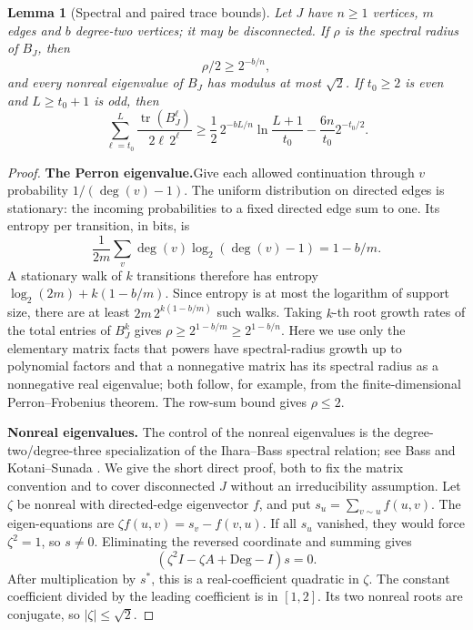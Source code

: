 \documentclass[11pt,a4paper]{article}
\numberwithin{equation}{section}
\newtheorem{lemma}[theorem]{Lemma}
\theoremstyle{definition}
\theoremstyle{remark}
\newcommand{\tr}{\operatorname{tr}}
\newcommand{\proofstep}[1]{\par\addvspace{\medskipamount}\noindent\textbf{#1}\enspace\ignorespaces}
\begin{document}
\begin{lemma}[Spectral and paired trace bounds]\label{lem:trace}
Let $J$ have $n\ge1$ vertices, $m$ edges and $b$ degree-two vertices; it may be disconnected. If $\rho$ is the spectral radius of $B_J$, then
\[
 \rho/2\ge2^{-b/n},
\]
and every nonreal eigenvalue of $B_J$ has modulus at most $\sqrt2$. If $t_0\ge2$ is even and $L\ge t_0+1$ is odd, then
\begin{equation}\label{eq:paired-trace}
 \sum_{\ell=t_0}^{L}\frac{\tr(B_J^\ell)}{2\ell\,2^\ell}
 \ge \frac12\,2^{-bL/n}\ln\frac{L+1}{t_0}
          -\frac{6n}{t_0}2^{-t_0/2}.
\end{equation}
\end{lemma}
\begin{proof}
\textbf{The Perron eigenvalue.}\enspace Give each allowed continuation through $v$ probability $1/(\deg(v)-1)$. The uniform distribution on directed edges is stationary: the incoming probabilities to a fixed directed edge sum to one. Its entropy per transition, in bits, is
\[
 \frac1{2m}\sum_v\deg(v)\log_2(\deg(v)-1)=1-b/m.
\]
A stationary walk of $k$ transitions therefore has entropy $\log_2(2m)+k(1-b/m)$. Since entropy is at most the logarithm of support size, there are at least $2m\,2^{k(1-b/m)}$ such walks. Taking $k$-th root growth rates of the total entries of $B_J^k$ gives $\rho\ge2^{1-b/m}\ge2^{1-b/n}$. Here we use only the elementary matrix facts that powers have spectral-radius growth up to polynomial factors and that a nonnegative matrix has its spectral radius as a nonnegative real eigenvalue; both follow, for example, from the finite-dimensional Perron--Frobenius theorem. The row-sum bound gives $\rho\le2$.

\proofstep{Nonreal eigenvalues.}
The control of the nonreal eigenvalues is the degree-two/degree-three specialization of the Ihara--Bass spectral relation; see Bass \cite{Bass} and Kotani--Sunada \cite[Theorem~1.3(2)]{KS}. We give the short direct proof, both to fix the matrix convention and to cover disconnected $J$ without an irreducibility assumption. Let $\zeta$ be nonreal with directed-edge eigenvector $f$, and put $s_u=\sum_{v\sim u}f(u,v)$. The eigen-equations are $\zeta f(u,v)=s_v-f(v,u)$. If all $s_u$ vanished, they would force $\zeta^2=1$, so $s\ne0$. Eliminating the reversed coordinate and summing gives
\[
 (\zeta^2 I-\zeta A+\mathrm{Deg}-I)s=0.
\]
After multiplication by $s^*$, this is a real-coefficient quadratic in $\zeta$. The constant coefficient divided by the leading coefficient is in $[1,2]$. Its two nonreal roots are conjugate, so $|\zeta|\le\sqrt2$.


\end{proof}
\end{document}
